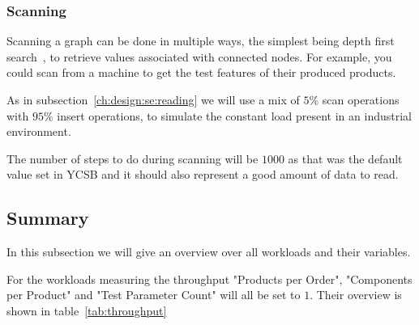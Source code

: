 \subsubsection{Scanning}
\label{ch:design:se:scanning}
Scanning a graph can be done in multiple ways,
the simplest being depth first search~\cite{Tarjan1972},
to retrieve values associated with connected nodes.
For example,
you could scan from a machine to get the test features of their produced products.

As in subsection~\ref{ch:design:se:reading} we will use a mix of $ 5\% $ scan operations with $ 95\% $ insert operations,
to simulate the constant load present in an industrial environment.

The number of steps to do during scanning will be $ 1000 $ as that was the default value set in YCSB and it should also represent a good amount of data to read.

\subsection{Summary}
\label{ch:design:se:summary}
In this subsection we will give an overview over all workloads and their variables.

For the workloads measuring the throughput "Products per Order",
"Components per Product" and "Test Parameter Count" will all be set to $ 1 $.
Their overview is shown in table~\ref{tab:throughput}

